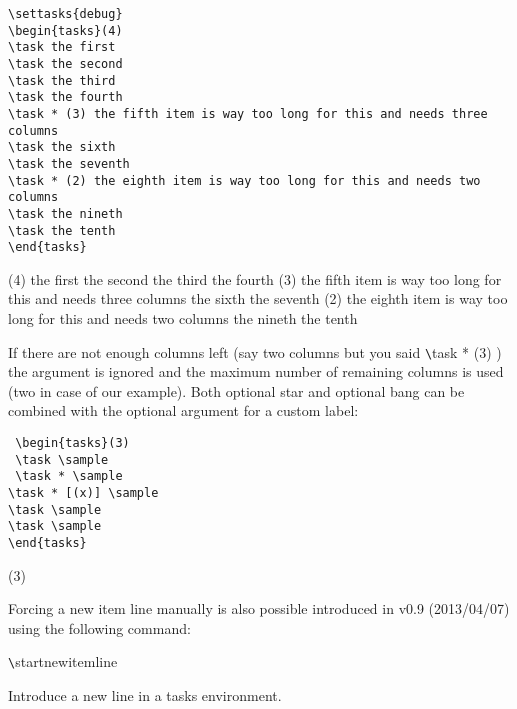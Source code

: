 \documentclass[a4paper,12pt,indent]{article}
\begin{document}
\begin{tcolorbox}[collower=black,colframe=Tasks,colback=white]
    \begin{lstlisting}
\settasks{debug}
\begin{tasks}(4)
\task the first
\task the second
\task the third
\task the fourth
\task * (3) the fifth item is way too long for this and needs three columns
\task the sixth
\task the seventh
\task * (2) the eighth item is way too long for this and needs two columns
\task the nineth
\task the tenth
\end{tasks}
    \end{lstlisting}
 \tcblower
{}
\begin{tasks}(4)
\task the first
\task the second
\task the third
\task the fourth
\task * (3) the fifth item is way too long for this and needs three columns
\task the sixth
\task the seventh
\task * (2) the eighth item is way too long for this and needs two columns
\task the nineth
\task the tenth
\end{tasks}
    \end{tcolorbox}

 If there are not enough columns left (say two columns but you said \verb|\|\textcolor{Tasks}{task * (3)} ) the argument
    is ignored and the maximum number of remaining columns is used (two in case of our example).
    Both optional star and optional bang can be combined with the optional argument for a
    custom label:

 \begin{tcolorbox}[collower=black,colframe=Tasks,colback=white]
 \begin{lstlisting}
 \begin{tasks}(3)
 \task \sample
 \task * \sample
\task * [(x)] \sample
\task \sample
\task \sample
\end{tasks}
 \end{lstlisting}
     \tcblower
     \begin{tasks}(3)
        \task \sample
        \task * \sample
       \task * [(x)] \sample
       \task \sample
       \task \sample
       \end{tasks}
        \end{tcolorbox}

Forcing a new item line manually is also possible introduced
in v0.9
(2013/04/07)
using the following command:

\verb|\|\textcolor{Tasks}{startnewitemline}

Introduce a new line in a tasks environment.
\end{document}
